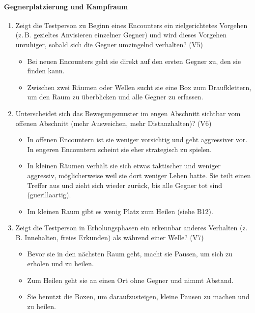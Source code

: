 \documentclass[../Main.tex]{subfiles}
\begin{document}
\paragraph{Gegnerplatzierung und Kampfraum}
\begin{enumerate}[label=\textbf{B\arabic*}, leftmargin=1.5cm, itemsep=0.8em, resume]
    \item Zeigt die Testperson zu Beginn eines Encounters ein zielgerichtetes Vorgehen (z.\,B. gezieltes Anvisieren einzelner Gegner) und wird dieses Vorgehen unruhiger, sobald sich die Gegner umzingelnd verhalten? \hfill (V5)
        \begin{itemize}[nosep]
            \item Bei neuen Encounters geht sie direkt auf den ersten Gegner zu, den sie finden kann.
            \item Zwischen zwei Räumen oder Wellen sucht sie eine Box zum Draufklettern, um den Raum zu überblicken und alle Gegner zu erfassen.
        \end{itemize}

    \item Unterscheidet sich das Bewegungsmuster im engen Abschnitt sichtbar vom offenen Abschnitt (mehr Ausweichen, mehr Distanzhalten)? \hfill (V6)
        \begin{itemize}[nosep]
            \item In offenen Encountern ist sie weniger vorsichtig und geht aggressiver vor. In engeren Encountern scheint sie eher strategisch zu spielen.
            \item In kleinen Räumen verhält sie sich etwas taktischer und weniger aggressiv, möglicherweise weil sie dort weniger Leben hatte. Sie teilt einen Treffer aus und zieht sich wieder zurück, bis alle Gegner tot sind (guerillaartig).
            \item Im kleinen Raum gibt es wenig Platz zum Heilen (siehe B12).
        \end{itemize}

    \item Zeigt die Testperson in Erholungsphasen ein erkennbar anderes Verhalten (z.\,B. Innehalten, freies Erkunden) als während einer Welle? \hfill (V7)
        \begin{itemize}[nosep]
            \item Bevor sie in den nächsten Raum geht, macht sie Pausen, um sich zu erholen und zu heilen.
            \item Zum Heilen geht sie an einen Ort ohne Gegner und nimmt Abstand.
            \item Sie benutzt die Boxen, um daraufzusteigen, kleine Pausen zu machen und zu heilen.
        \end{itemize}


\end{enumerate}
\end{document}
